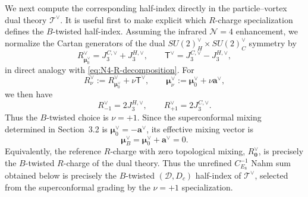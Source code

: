 \documentclass[11pt,a4paper]{article}
\numberwithin{equation}{section}
\begin{document}
We next compute the corresponding half-index directly in the particle--vortex dual theory $\mathcal T^\vee$.  It is useful first to make explicit which $R$-charge specialization defines the $B$-twisted half-index.  Assuming the infrared $\mathcal N=4$ enhancement, we normalize the Cartan generators of the dual $SU(2)_H^\vee\times SU(2)_C^\vee$ symmetry by
\begin{equation}
  R_{\boldsymbol\mu_0^\vee}^{\vee}
  =J_3^{C,\vee}+J_3^{H,\vee},
  \qquad
  \mathsf T^\vee
  =J_3^{C,\vee}-J_3^{H,\vee},
  \label{eq:dual-N4-R-decomposition-half}
\end{equation}
in direct analogy with \eqref{eq:N4-R-decomposition}.  For
\begin{equation}
  R_\nu^\vee
  :=R_{\boldsymbol\mu_0^\vee}^{\vee}+\nu\mathsf T^\vee,
  \qquad
  \boldsymbol\mu_\nu^\vee
  :=\boldsymbol\mu_0^\vee+\nu\boldsymbol a^\vee,
  \label{eq:dual-half-Rnu}
\end{equation}
we then have
\begin{equation}
  R_{-1}^\vee=2J_3^{H,\vee},
  \qquad
  R_{+1}^\vee=2J_3^{C,\vee}.
  \label{eq:dual-half-AB-R}
\end{equation}
Thus the $B$-twisted choice is $\nu=+1$.  Since the superconformal mixing determined in Section~3.2 is $\boldsymbol\mu_0^\vee=-\boldsymbol a^\vee$, its effective mixing vector is
\begin{equation}
  \boldsymbol\mu_B^\vee
  =\boldsymbol\mu_0^\vee+\boldsymbol a^\vee
  =0.
  \label{eq:dual-B-half-mixing-cancellation}
\end{equation}
Equivalently, the reference $R$-charge with zero topological mixing, $R_{\boldsymbol 0}^\vee$, is precisely the $B$-twisted $R$-charge of the dual theory.  Thus the unrefined $C_{E_8}^{-1}$ Nahm sum obtained below is precisely the $B$-twisted $(\mathcal D,D_c)$ half-index of $\mathcal T^\vee$, selected from the superconformal grading by the $\nu=+1$ specialization.
\end{document}
